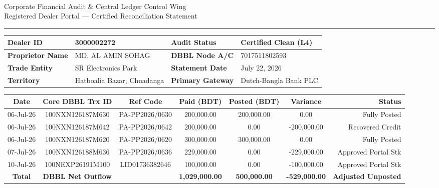 \documentclass[11pt,a4paper]{article}
\begin{document}
\pagestyle{empty}

\begin{center}
    {\LARGE \textbf{\color{navyblue}{BUTTERFLY MARKETING LIMITED}}}\\
    \vspace{2pt}
    {\small Corporate Financial Audit \& Central Ledger Control Wing}\\
    \vspace{2pt}
    {\footnotesize Registered Dealer Portal — Certified Reconciliation Statement}
\end{center}

\noindent\rule{\linewidth}{1.5pt}

\vspace{8pt}

\noindent
\begin{tabular}{|p{3.5cm}|p{5.0cm}|p{3.5cm}|p{4.5cm}|}
\hline
\rowcolor{lightgrey} \textbf{Dealer ID} & 3000002272 & \textbf{Audit Status} & Certified Clean (L4) \\ \hline
\textbf{Proprietor Name} & MD. AL AMIN SOHAG & \textbf{DBBL Node A/C} & 7017511802593 \\ \hline
\textbf{Trade Entity} & SR Electronics Park & \textbf{Statement Date} & July 22, 2026 \\ \hline
\textbf{Territory} & Hatboalia Bazar, Chuadanga & \textbf{Primary Gateway} & Dutch-Bangla Bank PLC \\ \hline
\end{tabular}

\vspace{12pt}

{\Large \textbf{\color{navyblue}{1. DBBL CBS Outflow vs. Butterfly SAP ERP Log}}}
\vspace{6pt}

\noindent
\begin{tabular}{ccccccr}
\toprule
\textbf{Date} & \textbf{Core DBBL Trx ID} & \textbf{Ref Code} & \textbf{Paid (BDT)} & \textbf{Posted (BDT)} & \textbf{Variance} & \textbf{Status} \\
\midrule
06-Jul-26 & 100NXN126187M630 & PA-PP2026/0630 & 200,000.00 & 200,000.00 & 0.00 & Fully Posted \\
06-Jul-26 & 100NXN126187M642 & PA-PP2026/0642 & 200,000.00 & 0.00 & -200,000.00 & Recovered Credit \\
06-Jul-26 & 100NXN126187M620 & PA-PP2026/0620 & 300,000.00 & 300,000.00 & 0.00 & Fully Posted \\
07-Jul-26 & 100NXN126188M636 & PA-PP2026/0636 & 229,000.00 & 0.00 & -229,000.00 & Approved Portal Stk \\
10-Jul-26 & 100NEXP26191M100 & LID01736382646 & 100,000.00 & 0.00 & -100,000.00 & Approved Portal Stk \\
\bottomrule
\textbf{Total} & \textbf{DBBL Net Outflow} & & \textbf{1,029,000.00} & \textbf{500,000.00} & \textbf{-529,000.00} & \textbf{Adjusted Unposted} \\
\end{tabular}
\end{document}
